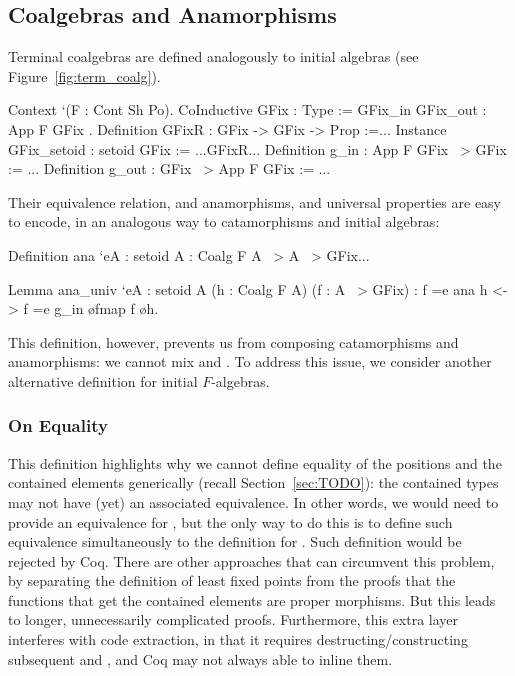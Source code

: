 \documentclass[anonymous, a4paper, UKenglish, cleveref, autoref, thm-restate]{lipics-v2021}
\begin{document}
\subsection{Coalgebras and Anamorphisms}
Terminal coalgebras are defined analogously to initial algebras (see
Figure~\ref{fig:term_coalg}).
\begin{coqcode}
Context `(F : Cont Sh Po).
CoInductive GFix : Type := GFix_in { GFix_out : App F GFix }.
Definition GFixR : GFix -> GFix -> Prop :=...
Instance GFix_setoid : setoid GFix := ...GFixR...
Definition g_in : App F GFix ~> GFix := ...
Definition g_out : GFix ~> App F GFix := ...
\end{coqcode}
Their equivalence relation, and anamorphisms, and universal properties are
easy to encode, in an analogous way to catamorphisms and initial algebras:
\begin{coqcode}
  Definition ana `{eA : setoid A} : Coalg F A ~> A ~> GFix...

  Lemma ana_univ `{eA : setoid A} (h : Coalg F A) (f : A ~> GFix)
    : f =e ana h <-> f =e g_in \o fmap f \o h.
\end{coqcode}
This definition, however, prevents us from composing catamorphisms and
anamorphisms: we cannot mix  and .
To address this issue, we consider another alternative definition
for initial $F$-algebras.

\subsubsection{On Equality}
This definition highlights why we cannot define equality of the positions and
the contained elements generically (recall Section~\ref{sec:TODO}): the
contained types may not have (yet) an associated equivalence. In other words, we
would need to provide an equivalence for , but the only way to do this
is to define such equivalence simultaneously to the definition for  .
Such definition would be rejected by Coq. There are other approaches that can
circumvent this problem, by separating the definition of least fixed points from
the proofs that the functions that get the contained elements are proper
morphisms. But this leads to longer, unnecessarily complicated proofs.
Furthermore, this extra layer interferes with code extraction, in that it
requires destructing/constructing subsequent  and , and Coq
may not always able to inline them.
\end{document}
